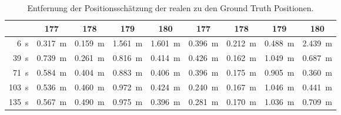 \begin{table}
	\centering
	\begin{tabular}{||r||c|c|c|c||c|c|c|c||}
		\hline
 & 177 & 178 & 179 & 180 & 177 & 178 & 179 & 180 \\
\hline
\SI{6}{\second} & \SI{0.317}{\meter} & \SI{0.159}{\meter} & \SI{1.561}{\meter} & \SI{1.601}{\meter} & \SI{0.396}{\meter} & \SI{0.212}{\meter} & \SI{0.488}{\meter} & \SI{2.439}{\meter} \\
\SI{39}{\second} & \SI{0.739}{\meter} & \SI{0.261}{\meter} & \SI{0.816}{\meter} & \SI{0.414}{\meter} & \SI{0.426}{\meter} & \SI{0.162}{\meter} & \SI{1.049}{\meter} & \SI{0.687}{\meter} \\
\SI{71}{\second} & \SI{0.584}{\meter} & \SI{0.404}{\meter} & \SI{0.883}{\meter} & \SI{0.406}{\meter} & \SI{0.396}{\meter} & \SI{0.175}{\meter} & \SI{0.905}{\meter} & \SI{0.360}{\meter} \\
\SI{103}{\second} & \SI{0.536}{\meter} & \SI{0.460}{\meter} & \SI{0.972}{\meter} & \SI{0.424}{\meter} & \SI{0.240}{\meter} & \SI{0.167}{\meter} & \SI{1.046}{\meter} & \SI{0.441}{\meter} \\
\SI{135}{\second} & \SI{0.567}{\meter} & \SI{0.490}{\meter} & \SI{0.975}{\meter} & \SI{0.396}{\meter} & \SI{0.281}{\meter} & \SI{0.170}{\meter} & \SI{1.036}{\meter} & \SI{0.709}{\meter} \\
\hline
	\end{tabular}
	\caption{Entfernung der Positionsschätzung der realen  zu den Ground Truth Positionen.}
	\label{tab:distance_between_real_uwb_and_gt}
\end{table}

